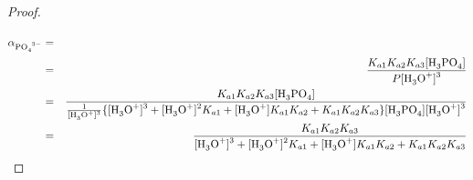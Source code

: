 \documentclass[10pt,twoside,a4paper]{article}
\begin{document}
\begin{proof}
 	\begin{eqnarray}
 		\alpha_{\ce{PO4^{3-}}} & = & \frac{\ce{[PO4^{3-}]}}{P} \hspace{-10cm} \nonumber  \\
 		& = & \frac{K_{a1}K_{a2}K_{a3}\ce{[H3PO4]}}{P\ce{[H3O+]^3}} \nonumber \\
 		& = & \frac{K_{a1}K_{a2}K_{a3}\ce{[H3PO4]}}{\frac{1}{\ce{[H3O+]^3}} \{ \ce{[H3O+]^3} + \ce{[H3O+]^2}K_{a1} + \ce{[H3O+]}K_{a1}K_{a2} + K_{a1}K_{a2}K_{a3}\}\ce{[H3PO4][H3O+]^3}} \nonumber \\
 		& = & \frac{K_{a1}K_{a2}K_{a3}}{\ce{[H3O+]^3} + \ce{[H3O+]^2}K_{a1} + \ce{[H3O+]}K_{a1}K_{a2} + K_{a1}K_{a2}K_{a3}}
 		\end{eqnarray}	
 		
 		
 		
 	
 		
	\end{proof}
	
\end{document}
